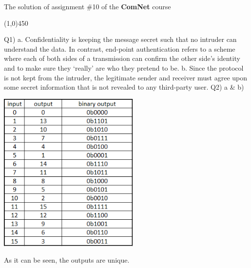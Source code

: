 \documentclass[10pt,letterpaper]{article}
\newcommand{\hl}{
\begin{center}
\line(1,0){450}
\end{center}}
\begin{document}
\Large
\begin{center}
The solution of assignment \#10 of the \textbf{ComNet} course
\end{center}
\hl
Q1) a. Confidentiality is keeping the message secret such that no intruder can understand the data. In contrast, end-point authentication refers to a scheme where each of both sides of a transmission can confirm the other side's identity and to make sure they `really' are who they pretend to be.
\newline\newline
b. Since the protocol is not kept from the intruder, the legitimate sender and receiver must agree upon some secret information that is not revealed to any third-party user.
\newline\newline
Q2) a \& b)
\begin{center}
\includegraphics[width=70mm]{Table_10.png}
\end{center}
As it can be seen, the outputs are unique.
\end{document}
